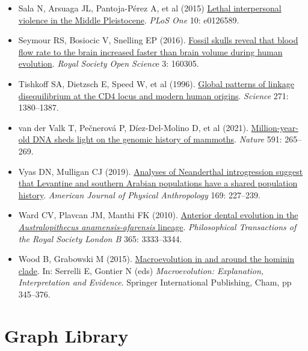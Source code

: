 \documentclass[
]{book}
\begin{document}
\begin{itemize}
\item
  Sala N, Arsuaga JL, Pantoja-Pérez A, et al (2015) \href{https://journals.plos.org/plosone/article?id=10.1371/journal.pone.0126589}{Lethal interpersonal violence in the Middle Pleistocene}. \emph{PLoS One} 10: e0126589.
\item
  Seymour RS, Bosiocic V, Snelling EP (2016). \href{https://royalsocietypublishing-org.er.lib.k-state.edu/doi/10.1098/rsos.160305}{Fossil skulls reveal that blood flow rate to the brain increased faster than brain volume during human evolution}. \emph{Royal Society Open Scienc}e 3: 160305.
\item
  Tishkoff SA, Dietzsch E, Speed W, et al (1996). \href{https://www.science.org/doi/abs/10.1126/science.271.5254.1380}{Global patterns of linkage disequilibrium at the CD4 locus and modern human origins}. \emph{Science} 271: 1380--1387.
\item
  van der Valk T, Pečnerová P, Díez-Del-Molino D, et al (2021). \href{https://www.nature.com/articles/s41586-021-03224-9}{Million-year-old DNA sheds light on the genomic history of mammoths}. \emph{Nature} 591: 265--269.
\item
  Vyas DN, Mulligan CJ (2019). \href{https://onlinelibrary.wiley.com/doi/10.1002/ajpa.23818}{Analyses of Neanderthal introgression suggest that Levantine and southern Arabian populations have a shared population history}. \emph{American Journal of Physical Anthropology} 169: 227--239.
\item
  Ward CV, Plavcan JM, Manthi FK (2010). \href{https://royalsocietypublishing.org/doi/10.1098/rstb.2010.0039}{Anterior dental evolution in the \emph{Australopithecus anamensis-afarensis} lineage}. \emph{Philosophical Transactions of the Royal Society London B} 365: 3333--3344.
\item
  Wood B, Grabowski M (2015). \href{https://link.springer.com/chapter/10.1007/978-3-319-15045-1_11}{Macroevolution in and around the hominin clade}. In: Serrelli E, Gontier N (eds) \emph{Macroevolution: Explanation, Interpretation and Evidence}. Springer International Publishing, Cham, pp 345--376.
\end{itemize}

\hypertarget{appendix-appendix-i}{%
\appendix}


\hypertarget{graph-library}{%
\chapter{Graph Library}\label{graph-library}}
\end{document}
